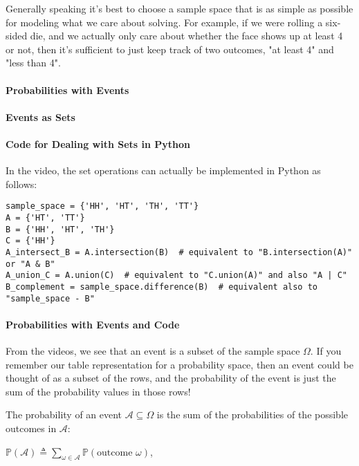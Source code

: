 \documentclass[6008notes.tex]{subfiles}
\begin{document}
Generally speaking it's best to choose a sample space that is as simple as possible for modeling what we care about solving. For example, if we were rolling a six-sided die, and we actually only care about whether the face shows up at least 4 or not, then it's sufficient to just keep track of two outcomes, "at least 4" and "less than 4".

\paragraph{Probabilities with Events}

\paragraph{Events as Sets}

\paragraph{Code for Dealing with Sets in Python}

In the video, the set operations can actually be implemented in Python as follows:

\begin{lstlisting}
sample_space = {'HH', 'HT', 'TH', 'TT'}
A = {'HT', 'TT'}
B = {'HH', 'HT', 'TH'}
C = {'HH'}
A_intersect_B = A.intersection(B)  # equivalent to "B.intersection(A)" or "A & B"
A_union_C = A.union(C)  # equivalent to "C.union(A)" and also "A | C"
B_complement = sample_space.difference(B)  # equivalent also to "sample_space - B"
\end{lstlisting}

\paragraph{Probabilities with Events and Code}

From the videos, we see that an event is a subset of the sample space $\Omega$. If you remember our table representation for a probability space, then an event could be thought of as a subset of the rows, and the probability of the event is just the sum of the probability values in those rows!

The probability of an event $\mathcal{A}\subseteq \Omega$ is the sum of the probabilities of the possible outcomes in $\mathcal{A}$:

$\mathbb {P}(\mathcal{A})\triangleq \sum _{\omega \in \mathcal{A}}\mathbb {P}(\text {outcome }\omega )$,
 
\end{document}
